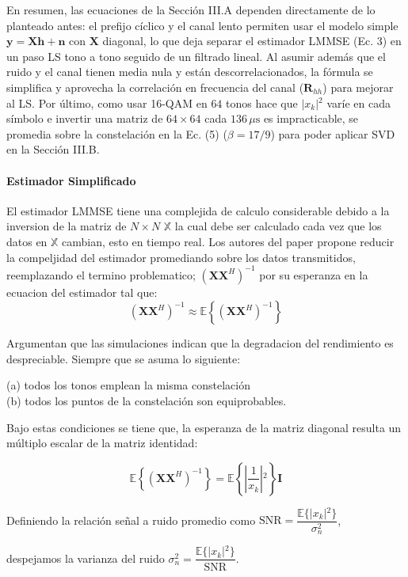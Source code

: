 \documentclass[a4paper]{article}
\begin{document}
En resumen, las ecuaciones de la Sección III.A dependen directamente de lo planteado antes: el prefijo cíclico y el canal lento permiten usar el modelo simple $\mathbf{y} = \mathbf{X}\mathbf{h} + \mathbf{n}$ con $\mathbf{X}$ diagonal, lo que deja separar el estimador LMMSE (Ec. 3) en un paso LS tono a tono seguido de un filtrado lineal. Al asumir además que el ruido y el canal tienen media nula y están descorrelacionados, la fórmula se simplifica y aprovecha la correlación en frecuencia del canal ($\mathbf{R}_{hh}$) para mejorar al LS. Por último, como usar 16-QAM en $64$ tonos hace que $\vert{}x_k\vert{}^2$ varíe en cada símbolo e invertir una matriz de $64 \times 64$ cada $136\,\mu\text{s}$ es impracticable, se promedia sobre la constelación en la Ec. (5) ($\beta = 17/9$) para poder aplicar SVD en la Sección III.B.


\paragraph{Estimador Simplificado}
El estimador LMMSE tiene una complejida de calculo considerable debido a la inversion de la matriz de  $N \times N$ $\mathbb{X}$ la cual debe ser calculado cada vez que los datos en $\mathbb{X}$ cambian, esto en tiempo real. Los autores del paper propone reducir la compeljidad del estimador promediando sobre los datos transmitidos, reemplazando el termino problematico; $(\mathbf{X}\mathbf{X}^H)^{-1}$ por su esperanza en la ecuacion del estimador tal que:
$$(\mathbf{X}\mathbf{X}^H)^{-1} \approx \mathbb{E}\left\{(\mathbf{X}\mathbf{X}^H)^{-1}\right\}$$

Argumentan que las simulaciones indican que la degradacion del rendimiento es despreciable. Siempre que se asuma lo siguiente:

(a) todos los tonos emplean la misma constelación \\
(b) todos los puntos de la constelación son equiprobables. 

Bajo estas condiciones se tiene que, la esperanza de la matriz diagonal resulta un múltiplo escalar de la matriz identidad:

$$\mathbb{E}\left\{(\mathbf{X}\mathbf{X}^H)^{-1}\right\} = \mathbb{E}\left\{\left\vert{}\frac{1}{x_k}\right\vert{}^2\right\}\mathbf{I}$$

Definiendo la relación señal a ruido promedio como $\text{SNR} = \dfrac{\mathbb{E}\{\vert{}x_k\vert{}^2\}}{\sigma_n^2}$, 

despejamos la varianza del ruido $\sigma_n^2 = \dfrac{\mathbb{E}\{\vert{}x_k\vert{}^2\}}{\text{SNR}}$.
\end{document}

